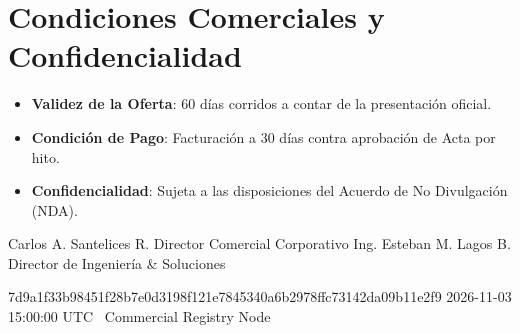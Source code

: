 \documentclass[11pt,letterpaper]{article}
\begin{document}
\vspace{0.3em}


\vspace{0.1em}

\section{Condiciones Comerciales y Confidencialidad}

\begin{itemize}[leftmargin=1.5em, itemsep=1pt, topsep=1pt]
  \item \textbf{Validez de la Oferta}: 60 d\'ias corridos a contar de la presentaci\'on oficial.
  \item \textbf{Condici\'on de Pago}: Facturaci\'on a 30 d\'ias contra aprobaci\'on de Acta por hito.
  \item \textbf{Confidencialidad}: Sujeta a las disposiciones del Acuerdo de No Divulgaci\'on (NDA).
\end{itemize}

\dualcontrolsignature
  {Carlos A. Santelices R.}
  {Director Comercial Corporativo}
  {\corporatebrandlegal}
  {Ing. Esteban M. Lagos B.}
  {Director de Ingenier\'ia \& Soluciones}
  {\corporatebrandlegal}

\vspace{0.4em}

\cryptoseal
  {7d9a1f33b98451f28b7e0d3198f121e7845340a6b2978ffc73142da09b11e2f9}
  {2026-11-03 15:00:00 UTC}
  {\corporatebrandname\ Commercial Registry Node}
\end{document}
